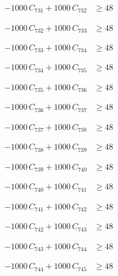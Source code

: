 \documentclass[a4paper,11pt]{article}
\begin{document}
\begin{align}
-1000\,C_{731} + 1000\,C_{732} &\geq 48 \nonumber
\end{align}

\begin{align}
-1000\,C_{732} + 1000\,C_{733} &\geq 48 \nonumber
\end{align}

\begin{align}
-1000\,C_{733} + 1000\,C_{734} &\geq 48 \nonumber
\end{align}

\begin{align}
-1000\,C_{734} + 1000\,C_{735} &\geq 48 \nonumber
\end{align}

\begin{align}
-1000\,C_{735} + 1000\,C_{736} &\geq 48 \nonumber
\end{align}

\begin{align}
-1000\,C_{736} + 1000\,C_{737} &\geq 48 \nonumber
\end{align}

\begin{align}
-1000\,C_{737} + 1000\,C_{738} &\geq 48 \nonumber
\end{align}

\begin{align}
-1000\,C_{738} + 1000\,C_{739} &\geq 48 \nonumber
\end{align}

\begin{align}
-1000\,C_{739} + 1000\,C_{740} &\geq 48 \nonumber
\end{align}

\begin{align}
-1000\,C_{740} + 1000\,C_{741} &\geq 48 \nonumber
\end{align}

\begin{align}
-1000\,C_{741} + 1000\,C_{742} &\geq 48 \nonumber
\end{align}

\begin{align}
-1000\,C_{742} + 1000\,C_{743} &\geq 48 \nonumber
\end{align}

\begin{align}
-1000\,C_{743} + 1000\,C_{744} &\geq 48 \nonumber
\end{align}

\begin{align}
-1000\,C_{744} + 1000\,C_{745} &\geq 48 \nonumber
\end{align}
\end{document}
